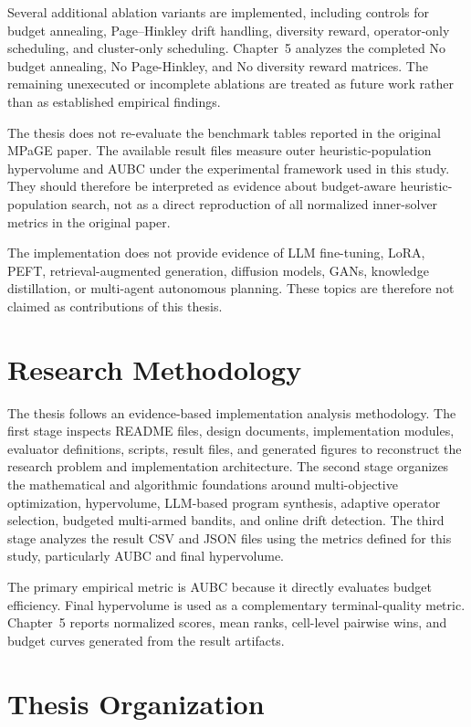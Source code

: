 \documentclass[../main.tex]{subfiles}
\begin{document}
Several additional ablation variants are implemented, including controls for budget annealing, Page--Hinkley drift handling, diversity reward, operator-only scheduling, and cluster-only scheduling. Chapter~5 analyzes the completed No budget annealing, No Page-Hinkley, and No diversity reward matrices. The remaining unexecuted or incomplete ablations are treated as future work rather than as established empirical findings.

The thesis does not re-evaluate the benchmark tables reported in the original MPaGE paper. The available result files measure outer heuristic-population hypervolume and AUBC under the experimental framework used in this study. They should therefore be interpreted as evidence about budget-aware heuristic-population search, not as a direct reproduction of all normalized inner-solver metrics in the original paper.

The implementation does not provide evidence of LLM fine-tuning, LoRA, PEFT, retrieval-augmented generation, diffusion models, GANs, knowledge distillation, or multi-agent autonomous planning. These topics are therefore not claimed as contributions of this thesis.

\section{Research Methodology}

The thesis follows an evidence-based implementation analysis methodology. The first stage inspects README files, design documents, implementation modules, evaluator definitions, scripts, result files, and generated figures to reconstruct the research problem and implementation architecture. The second stage organizes the mathematical and algorithmic foundations around multi-objective optimization, hypervolume, LLM-based program synthesis, adaptive operator selection, budgeted multi-armed bandits, and online drift detection. The third stage analyzes the result CSV and JSON files using the metrics defined for this study, particularly AUBC and final hypervolume.

The primary empirical metric is AUBC because it directly evaluates budget efficiency. Final hypervolume is used as a complementary terminal-quality metric. Chapter~5 reports normalized scores, mean ranks, cell-level pairwise wins, and budget curves generated from the result artifacts.

\section{Thesis Organization}
\end{document}
